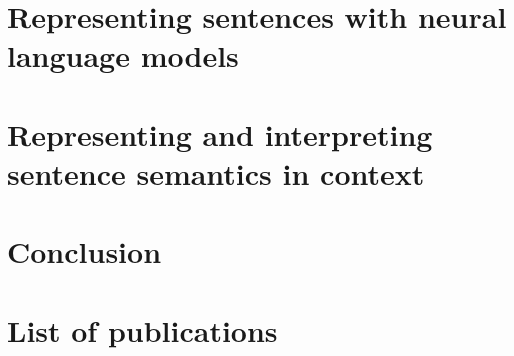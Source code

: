\documentclass[withindex,glossary]{cam-thesis}
\begin{document}
\chapter{Representing sentences with neural language models}

\chapter{Representing and interpreting sentence semantics in context}

\chapter{Conclusion}

\chapter*{List of publications}




\cleardoublepage
{}
{}




\appendix

\chapter{}




%


\printthesisindex
\end{document}
